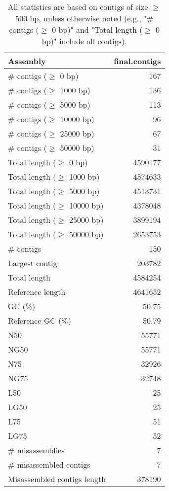 \documentclass[12pt,a4paper]{article}
\begin{document}
\begin{table}[ht]
\begin{center}
\caption{All statistics are based on contigs of size $\geq$ 500 bp, unless otherwise noted (e.g., "\# contigs ($\geq$ 0 bp)" and "Total length ($\geq$ 0 bp)" include all contigs).}
\begin{tabular}{|l*{1}{|r}|}
\hline
Assembly & final.contigs \\ \hline
\# contigs ($\geq$ 0 bp) & 167 \\ \hline
\# contigs ($\geq$ 1000 bp) & 136 \\ \hline
\# contigs ($\geq$ 5000 bp) & 113 \\ \hline
\# contigs ($\geq$ 10000 bp) & 96 \\ \hline
\# contigs ($\geq$ 25000 bp) & 67 \\ \hline
\# contigs ($\geq$ 50000 bp) & 31 \\ \hline
Total length ($\geq$ 0 bp) & 4590177 \\ \hline
Total length ($\geq$ 1000 bp) & 4574633 \\ \hline
Total length ($\geq$ 5000 bp) & 4513731 \\ \hline
Total length ($\geq$ 10000 bp) & 4378048 \\ \hline
Total length ($\geq$ 25000 bp) & 3899194 \\ \hline
Total length ($\geq$ 50000 bp) & 2653753 \\ \hline
\# contigs & 150 \\ \hline
Largest contig & 203782 \\ \hline
Total length & 4584254 \\ \hline
Reference length & 4641652 \\ \hline
GC (\%) & 50.75 \\ \hline
Reference GC (\%) & 50.79 \\ \hline
N50 & 55771 \\ \hline
NG50 & 55771 \\ \hline
N75 & 32926 \\ \hline
NG75 & 32748 \\ \hline
L50 & 25 \\ \hline
LG50 & 25 \\ \hline
L75 & 51 \\ \hline
LG75 & 52 \\ \hline
\# misassemblies & 7 \\ \hline
\# misassembled contigs & 7 \\ \hline
Misassembled contigs length & 378190 \\ \hline

\end{tabular}
\end{center}
\end{table}
\end{document}
